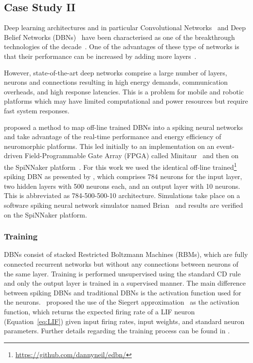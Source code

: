 \documentclass{frontiersENG} %
\begin{document}
\subsection{Case Study II}
Deep learning architectures and in particular Convolutional Networks~\citep{lecun1998gradient} and Deep Belief Networks (DBNs)~\citep{hinton2006fast} have been characterised as one of the breakthrough technologies of the decade~\citep{MIT_TechReview}. One of the advantages of these type of networks is that their performance can be increased by adding more layers~\citep{hinton2006fast}.

However, state-of-the-art deep networks comprise a large number of layers, neurons and connections resulting in high energy demands, communication overheads, and high response latencies. This is a problem for mobile and robotic platforms which may have limited computational and power resources but require fast system responses. 


\citet{o2013real} proposed a method to map off-line trained DBNs into a spiking neural networks and take advantage of the real-time performance and energy efficiency of neuromorphic platforms. This led initially to an implementation on an event-driven Field-Programmable Gate Array (FPGA) called Minitaur~\citep{neil2014minitaur} and then on the SpiNNaker platform~\citep{Stromatias2015scalable}. For this work we used the identical off-line trained\footnote{\url{https://github.com/dannyneil/edbn/}} spiking DBN as presented by \citet{o2013real}, which comprises 784 neurons for the input layer, two hidden layers with 500 neurons each, and an output layer with 10 neurons. This is abbreviated as 784-500-500-10 architecture. Simulations take place on a software spiking neural network simulator named Brian~\citep{goodman2008brian} and results are verified on the SpiNNaker platform.

\subsubsection{Training}

DBNs consist of stacked Restricted Boltzmann Machines (RBMs), which are fully connected recurrent networks but without any connections between neurons of the same layer. Training is performed unsupervised using the standard CD rule~\citep{hinton2006fast} and only the output layer is trained in a supervised manner. The main difference between spiking DBNs and traditional DBNs is the activation function used for the neurons.~\cite{o2013real} proposed the use of the Siegert approximation~\citep{Jug_etal_2012} as the activation function, which returns the expected firing rate of a LIF neuron (Equation~\ref{eq:LIF}) given input firing rates, input weights, and standard neuron parameters. Further details regarding the training process can be found in \citet{o2013real}.
\end{document}
